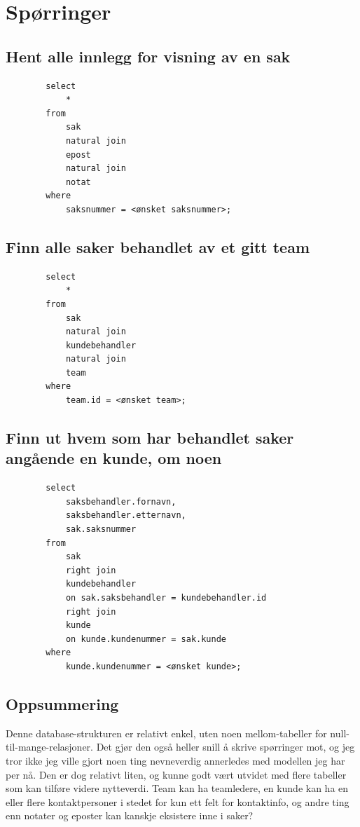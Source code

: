 \documentclass[]{article}
\begin{document}
    \section*{Spørringer}

    \subsection*{Hent alle innlegg for visning av en sak}

    \begin{verbatim}
        select
            *
        from 
            sak
            natural join
            epost
            natural join
            notat
        where
            saksnummer = <ønsket saksnummer>;
    \end{verbatim}

    \subsection*{Finn alle saker behandlet av et gitt team}

    \begin{verbatim}
        select
            *
        from
            sak
            natural join
            kundebehandler
            natural join
            team
        where
            team.id = <ønsket team>;
    \end{verbatim}
    
    \subsection*{Finn ut hvem som har behandlet saker angående en kunde, om noen}

    \begin{verbatim}
        select
            saksbehandler.fornavn,
            saksbehandler.etternavn,
            sak.saksnummer
        from
            sak
            right join
            kundebehandler
            on sak.saksbehandler = kundebehandler.id
            right join
            kunde
            on kunde.kundenummer = sak.kunde
        where
            kunde.kundenummer = <ønsket kunde>;
    \end{verbatim}

    \subsection*{Oppsummering}

    Denne database-strukturen er relativt enkel, uten noen mellom-tabeller for null-til-mange-relasjoner. Det gjør den også heller snill å skrive spørringer mot, og jeg tror ikke jeg ville gjort noen ting nevneverdig annerledes med modellen jeg har per nå. Den er dog relativt liten, og kunne godt vært utvidet med flere tabeller som kan tilføre videre nytteverdi. Team kan ha teamledere, en kunde kan ha en eller flere kontaktpersoner i stedet for kun ett felt for kontaktinfo, og andre ting enn notater og eposter kan kanskje eksistere inne i saker?
\end{document}
